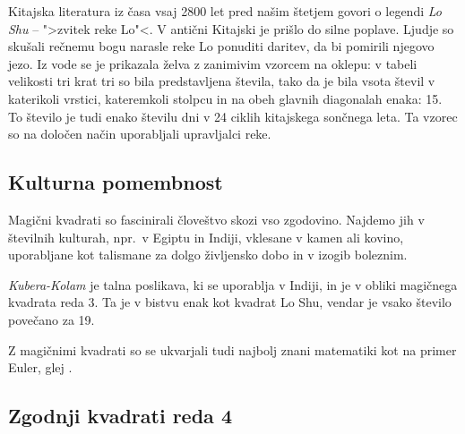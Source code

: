 \documentclass[a4paper,12pt]{article}
\newcommand{\pojem}[1]{\emph{\color{purple}#1}}
\begin{document}
Kitajska literatura iz časa vsaj 2800 let pred našim štetjem govori o legendi
\pojem{Lo Shu} -- ">zvitek reke Lo"<. V antični Kitajski je prišlo do
silne poplave. Ljudje so skušali rečnemu bogu narasle reke Lo ponuditi daritev,
da bi pomirili njegovo jezo. Iz vode se je prikazala želva z zanimivim vzorcem
na oklepu: v tabeli velikosti tri krat tri so bila predstavljena števila, tako
da je bila vsota števil v katerikoli vrstici, kateremkoli stolpcu in na obeh
glavnih diagonalah enaka: 15. To število je tudi enako številu dni v 24 ciklih
kitajskega sončnega leta. Ta vzorec so na določen način uporabljali upravljalci
reke.



\subsection{Kulturna pomembnost}

Magični kvadrati so fascinirali človeštvo skozi vso zgodovino. Najdemo jih
v številnih kulturah, npr.\ v Egiptu in Indiji, vklesane v kamen ali
kovino, uporabljane kot talismane za dolgo življensko dobo in v
izogib boleznim.

\pojem{Kubera-Kolam} je talna poslikava, ki se uporablja v Indiji, in je v
obliki magičnega kvadrata reda 3. Ta je v bistvu enak kot kvadrat
Lo Shu, vendar je vsako število povečano za 19.


Z magičnimi kvadrati so se ukvarjali tudi najbolj znani matematiki kot na
primer Euler, glej \cite{euler}. %


\subsection{Zgodnji kvadrati reda 4}
\end{document}
